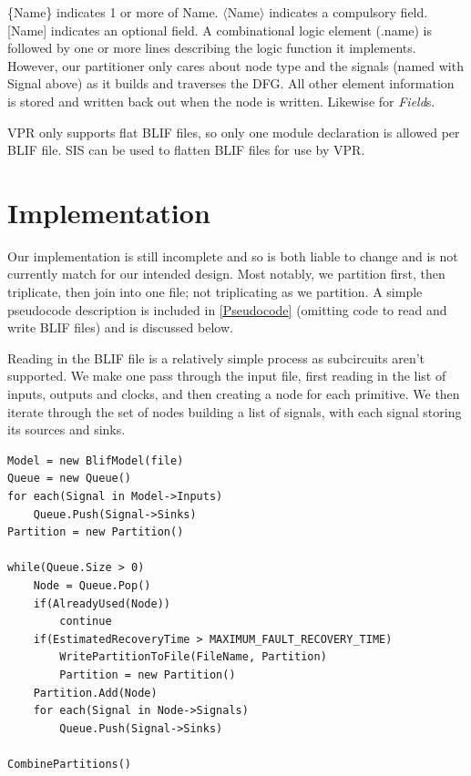 \documentclass[12pt,final,oneside]{dwThesis} %
\begin{document}
\{Name\} indicates 1 or more of Name. $\langle$Name$\rangle$ indicates a compulsory field. [Name] indicates an optional field.
A combinational logic element (.name) is followed by one or more lines describing the logic function it implements. However, our partitioner only cares about node type and the signals (named with Signal above) as it builds and traverses the \ac{DFG}. All other element information is stored and written back out when the node is written. Likewise for \emph{Field}s.

\ac{VPR} only supports flat \ac{BLIF} files, so only one module declaration is allowed per \ac{BLIF} file. \ac{SIS} can be used to flatten \ac{BLIF} files for use by \ac{VPR}.

\section{Implementation}
Our implementation is still incomplete and so is both liable to change and is not currently match for   our intended design. Most notably, we partition first, then triplicate, then join into one file; not triplicating as we partition. A simple pseudocode description is included in \ref{Pseudocode} (omitting code to read and write \ac{BLIF} files) and is discussed below.

Reading in the \ac{BLIF} file is a relatively simple process as subcircuits aren't supported. We make one pass through the input file, first reading in the list of inputs, outputs and clocks, and then creating a node for each primitive. We then iterate through the set of nodes building a list of signals, with each signal storing its sources and sinks.

\begin{lstlisting}[caption=Simplified Pseudocode,label=Pseudocode]
Model = new BlifModel(file)
Queue = new Queue()
for each(Signal in Model->Inputs)
    Queue.Push(Signal->Sinks)
Partition = new Partition()

while(Queue.Size > 0)
    Node = Queue.Pop()
    if(AlreadyUsed(Node))
        continue
    if(EstimatedRecoveryTime > MAXIMUM_FAULT_RECOVERY_TIME)
        WritePartitionToFile(FileName, Partition)
        Partition = new Partition()
    Partition.Add(Node)
    for each(Signal in Node->Signals)
        Queue.Push(Signal->Sinks)

CombinePartitions()
\end{lstlisting}
\end{document}
